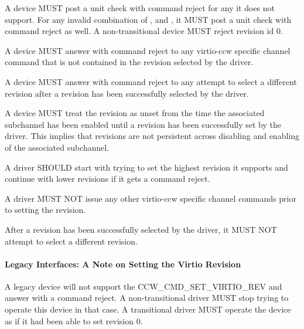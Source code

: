 A device MUST post a unit check with command reject for any 
it does not support. For any invalid combination of , 
and , it MUST post a unit check with command reject as well. A
non-transitional device MUST reject revision id 0.

A device MUST answer with command reject to any virtio-ccw specific
channel command that is not contained in the revision selected by the
driver.

A device MUST answer with command reject to any attempt to select a different revision
after a revision has been successfully selected by the driver.

A device MUST treat the revision as unset from the time the associated
subchannel has been enabled until a revision has been successfully set
by the driver. This implies that revisions are not persistent across
disabling and enabling of the associated subchannel.


A driver SHOULD start with trying to set the highest revision it
supports and continue with lower revisions if it gets a command reject.

A driver MUST NOT issue any other virtio-ccw specific channel commands
prior to setting the revision.

After a revision has been successfully selected by the driver, it
MUST NOT attempt to select a different revision.

\paragraph{Legacy Interfaces: A Note on Setting the Virtio Revision}\label{sec:Virtio Transport Options / Virtio over channel I/O / Device Initialization / Setting the Virtio Revision / Legacy Interfaces: A Note on Setting the Virtio Revision}

A legacy device will not support the CCW_CMD_SET_VIRTIO_REV and answer
with a command reject. A non-transitional driver MUST stop trying to
operate this device in that case. A transitional driver MUST operate
the device as if it had been able to set revision 0.

